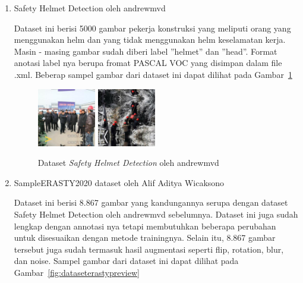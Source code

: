 \begin{enumerate}
  \item Safety Helmet Detection oleh andrewmvd
  \par Dataset ini berisi 5000 gambar pekerja konstruksi yang meliputi orang yang menggunakan helm dan yang tidak menggunakan helm keselamatan kerja. Masin - masing gambar sudah diberi label ”helmet” dan ”head”. Format anotasi label nya berupa fromat PASCAL VOC yang disimpan dalam file .xml. Beberap sampel gambar dari dataset ini dapat dilihat pada Gambar~\ref{fig:datasethelmetdetectionpreview}

  \begin{figure}[ht]
    \centering
    \includegraphics[width=0.24\textwidth]{gambar/sample_kaggle1/hard_hat_workers0.png}
    \includegraphics[width=0.24\textwidth]{gambar/sample_kaggle1/hard_hat_workers1.png}
    \caption{Dataset \emph{Safety Helmet Detection} oleh andrewmvd}
    \label{fig:datasethelmetdetectionpreview}  
  \end{figure}

  \item SampleERASTY2020 dataset oleh Alif Aditya Wicaksono
  \par Dataset ini berisi 8.867 gambar yang kandungannya serupa dengan dataset Safety Helmet Detection oleh andrewmvd sebelumnya. Dataset ini juga sudah lengkap dengan annotasi nya tetapi membutuhkan beberapa perubahan untuk disesuaikan dengan  metode trainingnya. Selain itu, 8.867 gambar tersebut juga sudah termasuk hasil augmentasi seperti flip, rotation, blur, dan noise. Sampel gambar dari dataset ini dapat dilihat pada Gambar~\ref{fig:dataseterastypreview}


\end{enumerate}
